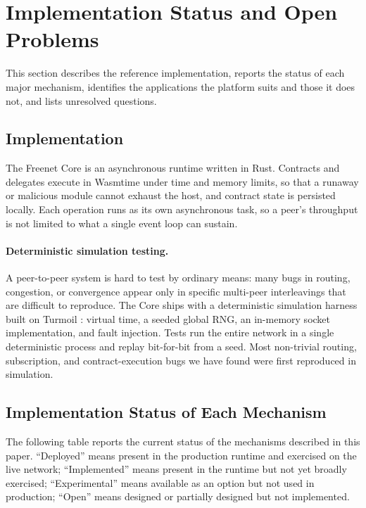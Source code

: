 \section{Implementation Status and Open Problems}
\label{sec:status}

This section describes the reference implementation, reports the status of each major mechanism, identifies the applications the platform suits and those it does not, and lists unresolved questions.

\subsection{Implementation}

The Freenet Core is an asynchronous runtime written in Rust. Contracts and delegates execute in Wasmtime \citep{wasmtime} under time and memory limits, so that a runaway or malicious module cannot exhaust the host, and contract state is persisted locally. Each operation runs as its own asynchronous task, so a peer's throughput is not limited to what a single event loop can sustain.

\paragraph{Deterministic simulation testing.} A peer-to-peer system is hard to test by ordinary means: many bugs in routing, congestion, or convergence appear only in specific multi-peer interleavings that are difficult to reproduce. The Core ships with a deterministic simulation harness built on Turmoil \citep{turmoil}: virtual time, a seeded global RNG, an in-memory socket implementation, and fault injection. Tests run the entire network in a single deterministic process and replay bit-for-bit from a seed. Most non-trivial routing, subscription, and contract-execution bugs we have found were first reproduced in simulation.

\subsection{Implementation Status of Each Mechanism}

The following table reports the current status of the mechanisms described in this paper. ``Deployed'' means present in the production runtime and exercised on the live network; ``Implemented'' means present in the runtime but not yet broadly exercised; ``Experimental'' means available as an option but not used in production; ``Open'' means designed or partially designed but not implemented.

